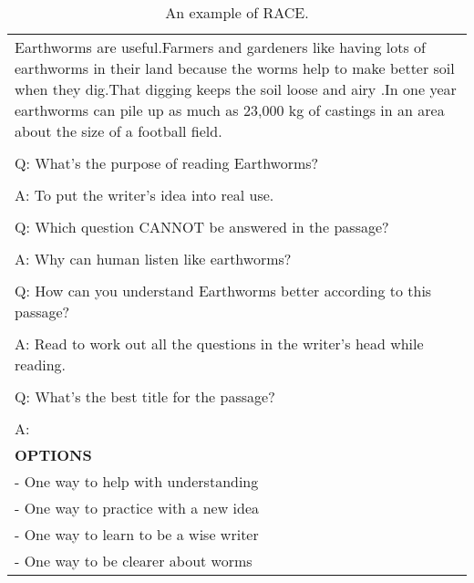 \begin{table}[ht]
\begin{tabular}{p{12cm}}
Earthworms are useful.Farmers and gardeners like having lots of earthworms in their land because the worms help to make better soil when they dig.That digging keeps the soil loose and airy .In one year earthworms can pile up as much as 23,000 kg of castings in an area about the size of a football field.\\
\\
Q: What's the purpose of reading Earthworms?\\
\\
A: To put the writer's idea into real use.\\
\\
Q: Which question CANNOT be answered in the passage?\\
\\
A: Why can human listen like earthworms?\\
\\
Q: How can you understand Earthworms better according to this passage?\\
\\
A: Read to work out all the questions in the writer's head while reading.\\
\\
Q: What's the best title for the passage?\\
\\
A:\\
\midrule
\textbf{OPTIONS}\\
- One way to help with understanding\\
- One way to practice with a new idea\\
- One way to learn to be a wise writer\\
- One way to be clearer about worms\\
\bottomrule
\end{tabular}
    \caption{\centering An example of RACE.}
    \label{tab:race_eval_format_example}
\end{table}

